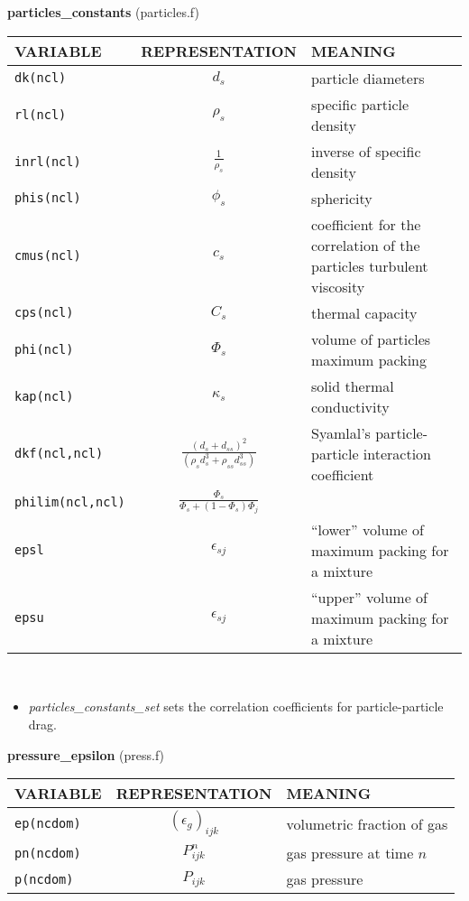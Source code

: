 %
{\large{\bf particles\_constants}} (particles.f)\\[5mm]
\begin{tabular}{|p{6cm}|c|p{6cm}|}\hline
VARIABLE & REPRESENTATION & MEANING\\\hline
\tt dk(ncl) & $d_s$ &  particle diameters\\\hline
\tt rl(ncl) & $\rho_s$ & specific particle density\\\hline
\tt inrl(ncl)& $\frac{1}{\rho_s} $& inverse of specific density\\\hline
\tt phis(ncl)& $\phi_s$   & sphericity\\\hline
\tt cmus(ncl) & $c_s$ & coefficient for the correlation of the particles turbulent viscosity\\\hline
\tt cps(ncl) & $C_s$ &   thermal capacity\\\hline
\tt phi(ncl) & $\Phi_s$ & volume of particles maximum packing\\\hline
\tt kap(ncl) & $\kappa_s$ &  solid thermal conductivity\\\hline
\tt dkf(ncl,ncl) & $\frac{(d_s+d_{ss})^2}{(\rho_sd_s^3+\rho_{ss}d_{ss}^3)}$ &   Syamlal's particle-particle interaction coefficient \\\hline
\tt philim(ncl,ncl) &$ \frac{\Phi_s}{\Phi_s+(1-\Phi_s)\Phi_j}$& \\\hline
\tt epsl & $\epsilon_{sj}$ & ``lower'' volume of maximum packing for a mixture\\\hline
\tt epsu & $\epsilon_{sj}$ & ``upper'' volume of maximum packing for a mixture\\\hline
\end{tabular}\\
\begin{itemize}
\item{\em particles\_constants\_set} sets the correlation coefficients for particle-particle drag.
\end{itemize}
%
%
{\large{\bf pressure\_epsilon}} (press.f)\\[5mm]
\begin{tabular}{|p{6cm}|c|p{6cm}|}\hline
VARIABLE & REPRESENTATION & MEANING\\\hline
\tt ep(ncdom) & $(\epsilon_g)_{ijk}$ &  volumetric fraction of gas\\\hline
\tt pn(ncdom) & $P_{ijk}^{n}$ &  gas pressure at time $n$\\\hline
\tt p(ncdom) & $P_{ijk}$ &  gas pressure\\\hline
\end{tabular}\\[5mm]

